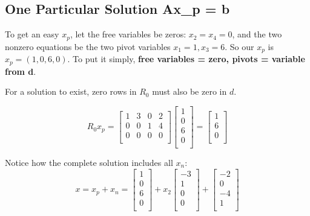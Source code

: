 \subsection{One Particular Solution Ax_p = b}

To get an easy \(x_p\), let the free variables be zeros: \(x_2 = x_4 = 0\), and the two nonzero equations be the two pivot variables \(x_1 = 1, x_3 = 6\). So our \(x_p\) is \(x_p = (1, 0, 6, 0)\). To put it simply, \textbf{free variables = zero, pivots = variable from d}. 

For a solution to exist, zero rows in \(R_0\) must also be zero in \(d\). 

\[
    R_{0}x_p = 
    \begin{bmatrix}
        1 & 3 & 0 & 2  \\
        0 & 0 & 1 & 4  \\
        0 & 0 & 0 & 0  \\
    \end{bmatrix} 
    \begin{bmatrix}
         1 \\
         0 \\
          6\\
          0\\
    \end{bmatrix}
    = 
    \begin{bmatrix}
         1 \\
          6\\
          0\\
    \end{bmatrix}
\]

Notice how the complete solution includes all \(x_n\):
\[
    x = x_p + x_n = 
    \begin{bmatrix}
         1 \\
         0 \\
         6 \\
         0 \\
    \end{bmatrix}
    + x_2
    \begin{bmatrix}
         -3 \\
         1 \\
         0 \\
         0 \\
    \end{bmatrix}
    +
    \begin{bmatrix}
        -2  \\
        0  \\
        -4  \\
        1  \\
    \end{bmatrix}
\] 

